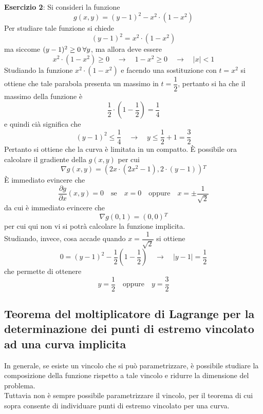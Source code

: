 \documentclass[a4paper]{extarticle}
\begin{document}
\vspace{2em}
\noindent
\textbf{Esercizio 2}: Si consideri la funzione
\[g(x,y) = (y-1)^2-x^2 \cdot (1-x^2)\]
Per studiare tale funzione si chiede
\[(y-1)^2=x^2 \cdot (1-x^2)\]
ma siccome $(y-1)^2 \geq 0 \hspace{0.25em} \forall y$, ma allora deve essere
\[x^2 \cdot (1-x^2) \geq 0 \hspace{1em} \rightarrow \hspace{1em} 1-x^2 \geq 0 \hspace{1em} \rightarrow \hspace{1em} \vert x \vert < 1\]
Studiando la funzione $x^2 \cdot (1-x^2)$ e facendo una sostituzione con $t=x^2$ si ottiene che tale parabola presenta un massimo in $t=\dfrac{1}{2}$, pertanto si ha che il massimo della funzione è
\[\dfrac{1}{2} \cdot (1-\dfrac{1}{2}) = \dfrac{1}{4}\]
e quindi cià significa che
\[(y-1)^2 \leq \dfrac{1}{4} \hspace{1em} \rightarrow \hspace{1em} y \leq \dfrac{1}{2} + 1 = \dfrac{3}{2}\]
Pertanto si ottiene che la curva è limitata in un compatto. È possibile ora calcolare il gradiente della $g(x,y)$ per cui
\[\nabla g(x,y) = \left(2x \cdot (2x^2 - 1), 2 \cdot (y-1)\right){^T}\]
È immediato evincere che
\[\dfrac{\partial g}{\partial x} (x,y) = 0 \hspace{1em} \text{se} \hspace{1em} x=0 \hspace{1em} \text{oppure} \hspace{1em} x=\pm\dfrac{1}{\sqrt{2}}\]
da cui è immediato evincere che
\[\nabla g(0,1) = (0,0){^T}\]
per cui qui non vi si potrà calcolare la funzione implicita.\\
Studiando, invece, cosa accade quando $x=\dfrac{1}{\sqrt{2}}$ si ottiene
\[0 = (y-1)^2 - \dfrac{1}{2} \left(1-\dfrac{1}{2}\right) \hspace{1em} \rightarrow \hspace{1em} \vert y-1 \vert = \dfrac{1}{2}\]
che permette di ottenere
\[y=\frac{1}{2} \hspace{1em} \text{oppure} \hspace{1em} y=\frac{3}{2}\]

\vspace{1em}
\noindent
\subsection{Teorema del moltiplicatore di Lagrange per la determinazione dei punti di estremo vincolato ad una curva implicita}
In generale, se esiste un vincolo che si può parametrizzare, è possibile studiare la composizione della funzione rispetto a tale vincolo e ridurre la dimensione del problema.\\
Tuttavia non è sempre possibile parametrizzare il vincolo, per il teorema di cui sopra consente di individuare punti di estremo vincolato per una curva.\\\\
\end{document}
